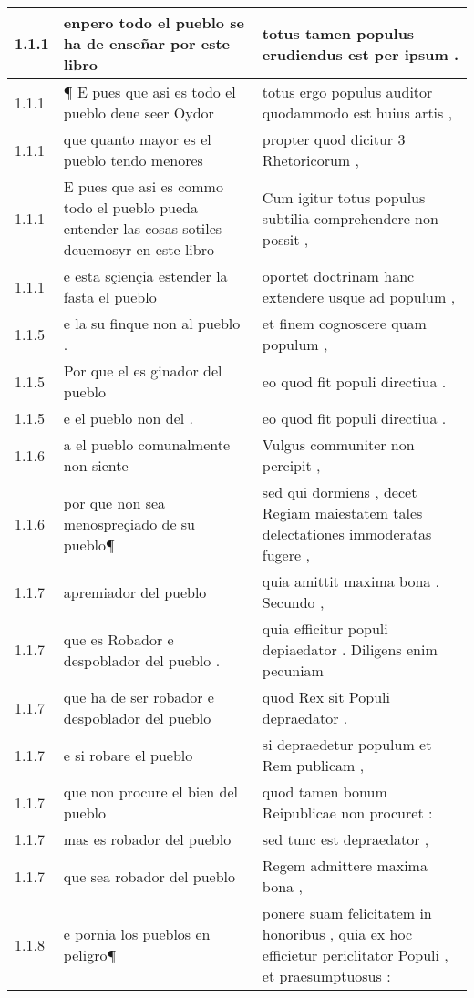 \begin{tabular}{|p{1cm}|p{6.5cm}|p{6.5cm}|}

\hline
1.1.1 & enpero todo el pueblo se ha de enseñar por este libro & totus tamen populus erudiendus est per ipsum . \\\hline
1.1.1 & ¶ E pues que asi es todo el pueblo deue seer Oydor & totus ergo populus auditor quodammodo est huius artis , \\\hline
1.1.1 & que quanto mayor es el pueblo tendo menores & propter quod dicitur 3 Rhetoricorum , \\\hline
1.1.1 & E pues que asi es commo todo el pueblo pueda entender las cosas sotiles deuemosyr en este libro & Cum igitur totus populus subtilia comprehendere non possit , \\\hline
1.1.1 & e esta sçiençia estender la fasta el pueblo & oportet doctrinam hanc extendere usque ad populum , \\\hline
1.1.5 & e la su finque non al pueblo . & et finem cognoscere quam populum , \\\hline
1.1.5 & Por que el es ginador del pueblo & eo quod fit populi directiua . \\\hline
1.1.5 & e el pueblo non del . & eo quod fit populi directiua . \\\hline
1.1.6 & a el pueblo comunalmente non siente & Vulgus communiter non percipit , \\\hline
1.1.6 & por que non sea menospreçiado de su pueblo¶ & sed qui dormiens , decet Regiam maiestatem tales delectationes immoderatas fugere , \\\hline
1.1.7 & apremiador del pueblo & quia amittit maxima bona . Secundo , \\\hline
1.1.7 & que es Robador e despoblador del pueblo . & quia efficitur populi depiaedator . Diligens enim pecuniam \\\hline
1.1.7 & que ha de ser robador e despoblador del pueblo & quod Rex sit Populi depraedator . \\\hline
1.1.7 & e si robare el pueblo & si depraedetur populum et Rem publicam , \\\hline
1.1.7 & que non procure el bien del pueblo & quod tamen bonum Reipublicae non procuret : \\\hline
1.1.7 & mas es robador del pueblo & sed tunc est depraedator , \\\hline
1.1.7 & que sea robador del pueblo & Regem admittere maxima bona , \\\hline
1.1.8 & e pornia los pueblos en peligro¶ & ponere suam felicitatem in honoribus , quia ex hoc efficietur periclitator Populi , et praesumptuosus : \\\hline

\end{tabular}
